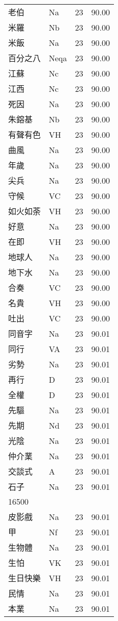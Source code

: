 \documentclass[twocolumn]{book}
\begin{document}
\begin{supertabular}{llrr}
老伯 & Na & 23 &  90.00\\
米羅 & Nb & 23 &  90.00\\
米飯 & Na & 23 &  90.00\\
百分之八 & Neqa & 23 &  90.00\\
江蘇 & Nc & 23 &  90.00\\
江西 & Nc & 23 &  90.00\\
死因 & Na & 23 &  90.00\\
朱鎔基 & Nb & 23 &  90.00\\
有聲有色 & VH & 23 &  90.00\\
曲風 & Na & 23 &  90.00\\
年歲 & Na & 23 &  90.00\\
尖兵 & Na & 23 &  90.00\\
守候 & VC & 23 &  90.00\\
如火如荼 & VH & 23 &  90.00\\
好意 & Na & 23 &  90.00\\
在即 & VH & 23 &  90.00\\
地球人 & Na & 23 &  90.00\\
地下水 & Na & 23 &  90.00\\
合奏 & VC & 23 &  90.00\\
名貴 & VH & 23 &  90.00\\
吐出 & VC & 23 &  90.00\\
同音字 & Na & 23 &  90.01\\
同行 & VA & 23 &  90.01\\
劣勢 & Na & 23 &  90.01\\
再行 & D & 23 &  90.01\\
全權 & D & 23 &  90.01\\
先驅 & Na & 23 &  90.01\\
先期 & Nd & 23 &  90.01\\
光陰 & Na & 23 &  90.01\\
仲介業 & Na & 23 &  90.01\\
交談式 & A & 23 &  90.01\\
石子 & Na & 23 &  90.01\\
16500\\
皮影戲 & Na & 23 &  90.01\\
甲 & Nf & 23 &  90.01\\
生物體 & Na & 23 &  90.01\\
生怕 & VK & 23 &  90.01\\
生日快樂 & VH & 23 &  90.01\\
民情 & Na & 23 &  90.01\\
本業 & Na & 23 &  90.01\\

\end{supertabular}
\end{document}
